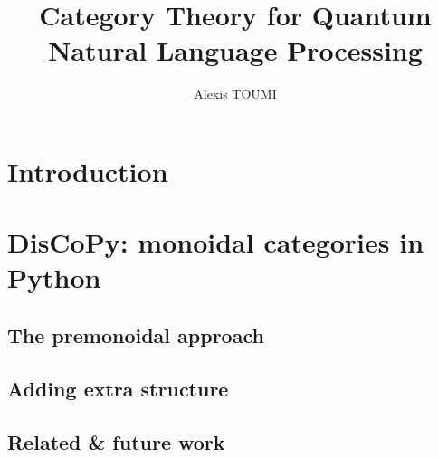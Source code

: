 

\title{Category Theory for Quantum\\
Natural Language Processing}
\author{Alexis TOUMI}

\degreedate{\today}




\begin{romanpages}
\maketitle

% 

\tableofcontents

\end{romanpages}

\chapter*{Introduction}






\chapter{DisCoPy: monoidal categories in Python}






\section{The premonoidal approach} \label{section:premonoidal}

\section{Adding extra structure} \label{section:extra structure}

\section{Related \& future work} \label{section:related and future}

